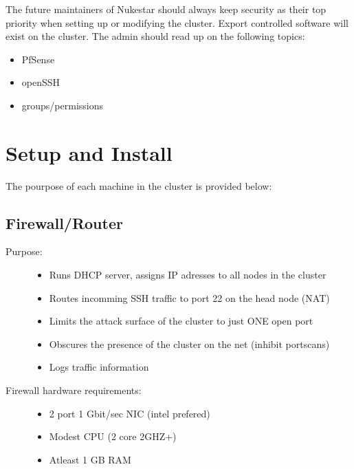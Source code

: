 \documentclass[letterpaper,10pt,english]{sphinxmanual}
\begin{document}
The future maintainers of Nukestar should always keep security as their top priority when
setting up or modifying the cluster.  Export controlled software
will exist on the cluster.  The admin should read up on the following topics:
\begin{itemize}
\item {} 
PfSense

\item {} 
openSSH

\item {} 
groups/permissions

\end{itemize}


\chapter{Setup and Install}
\label{setup:setup-and-install}\label{setup::doc}
The pourpose of each machine in the cluster is provided below:


\section{Firewall/Router}
\label{setup:firewall-router}\begin{description}
\item[{Purpose:}] \leavevmode\begin{itemize}
\item {} 
Runs DHCP server, assigns IP adresses to all nodes in the cluster

\item {} 
Routes incomming SSH traffic to port 22 on the head node (NAT)

\item {} 
Limits the attack surface of the cluster to just ONE open port

\item {} 
Obscures the presence of the cluster on the net (inhibit portscans)

\item {} 
Logs traffic information

\end{itemize}

\item[{Firewall hardware requirements:}] \leavevmode\begin{itemize}
\item {} 
2 port 1 Gbit/sec NIC (intel prefered)

\item {} 
Modest CPU  (2 core 2GHZ+)

\item {} 
Atleast 1 GB RAM

\end{itemize}

\end{description}
\end{document}
